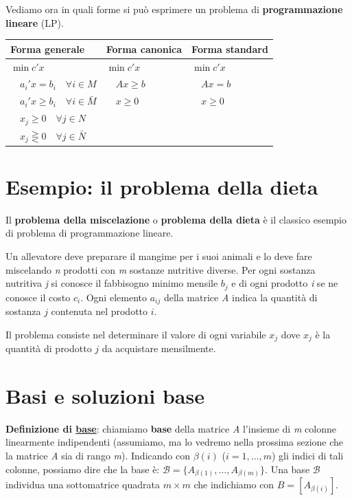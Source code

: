 \documentclass[11pt, oneside]{book}
\begin{document}
Vediamo ora in quali forme si pu\`o esprimere un problema di {\bf
  programmazione lineare} (LP).

\vspace{20pt}
\begin{center}
  \begin{tabular}{l|l|l}
    {\bf Forma generale} & {\bf Forma canonica} & {\bf Forma standard}
    \\\hline
    $\min c'x$ & $\min c'x$ & $\min c'x$ \\
    $\quad a_i'x = b_i \quad \forall i \in M$ & $\quad Ax \geq b$ &
    $\quad Ax = b$ \\
    $\quad a_i'x \geq b_i \quad \forall i \in \bar{M}$ & $\quad x\geq
    0$ & $\quad x \geq 0$ \\
    $\quad x_j \geq 0 \quad \forall j \in N$ && \\
    $\quad x_j \gtreqless 0 \quad \forall j \in \bar{N}$ && \\
  \end{tabular}
\end{center}
\vspace{20pt}

\section{Esempio: il problema della dieta}

Il {\bf problema della miscelazione} o {\bf problema della dieta} \`e
il classico esempio di problema di programmazione lineare.

\par\bigskip

Un allevatore deve preparare il mangime per i suoi animali e lo deve
fare miscelando {\em n} prodotti con {\em m} sostanze nutritive
diverse. Per ogni sostanza nutritiva {\em j} si conosce il fabbisogno
minimo mensile $b_j$ e di ogni prodotto {\em i} se ne conosce il costo
$c_i$. Ogni elemento $a_{ij}$ della matrice {\em A} indica la
quantit\`a di sostanza $j$ contenuta nel prodotto $i$.

Il problema consiste nel determinare il valore di ogni variabile $x_j$
dove $x_j$ \`e la quantit\`a di prodotto $j$ da acquistare mensilmente.

\section{Basi e soluzioni base}

{\bf Definizione di \underline{base}}: chiamiamo {\bf base} della
matrice {\em A} l'insieme di {\em m} colonne linearmente indipendenti
(assumiamo, ma lo vedremo nella prossima sezione che la matrice {\em
  A} sia di rango {\em m}). Indicando con $\beta(i)$ ($i = 1,\dots,m$)
gli indici di tali colonne, possiamo dire che la base \`e:
$\mathcal{B} = \{A_{\beta(1)},\dots,A_{\beta(m)}\}$. Una base
$\mathcal{B}$ individua una sottomatrice quadrata $m\times m$ che
indichiamo con $B = [A_{\beta(i)}]$.
\end{document}
